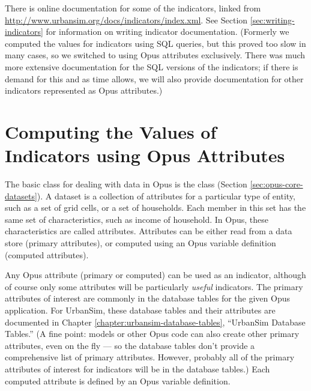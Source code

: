 There is online documentation for some of the indicators, 
linked from \url{http://www.urbansim.org/docs/indicators/index.xml}.  
See Section \ref{sec:writing-indicators} for information on writing indicator
\indicatorsindex documentation.  (Formerly we computed the values for
indicators using SQL queries, but this proved too slow in many cases, so we
switched to using Opus attributes exclusively.  There was much more
extensive documentation for the SQL versions of the indicators; if there is
demand for this and as time allows, we will also provide documentation for
other indicators represented as Opus attributes.)

\section{Computing the Values of Indicators using Opus Attributes}

The basic class for dealing with data in Opus is the class 
\datasetindex (Section \ref{sec:opus-core-datasets}).  A dataset
\datasetindex is a collection of attributes \attributesindex for a
particular type of entity, such as a set of grid cells, or a set of
households.  Each member in this set has the same set of characteristics,
such as income of household.  In Opus, these characteristics are called
attributes. \attributesindex Attributes \attributesindex can be either read
from a data store (primary attributes), \primaryattributesindex or computed
using an Opus variable definition (computed
attributes). \computedattributesindex

Any Opus attribute \attributesindex (primary or computed)
\computedattributesindex\primaryattributesindex can be used as an
indicator, \indicatorsindex although of course only some attributes
\attributesindex will be particularly \emph{useful}
indicators. \indicatorsindex The primary attributes \primaryattributesindex
of interest are commonly in the database tables for the given Opus
application.  For UrbanSim, these database tables and their attributes
\attributesindex are documented in Chapter
\ref{chapter:urbansim-database-tables}, ``UrbanSim Database Tables.''  (A
fine point: models or other Opus code can also create other primary
attributes, \primaryattributesindex even on the fly --- so the database
tables don't provide a comprehensive list of primary
attributes. \primaryattributesindex However, probably all of the primary
attributes \primaryattributesindex of interest for indicators
\indicatorsindex will be in the database tables.)  Each computed attribute
\computedattributesindex is defined by an Opus variable \variablesindex
definition.

